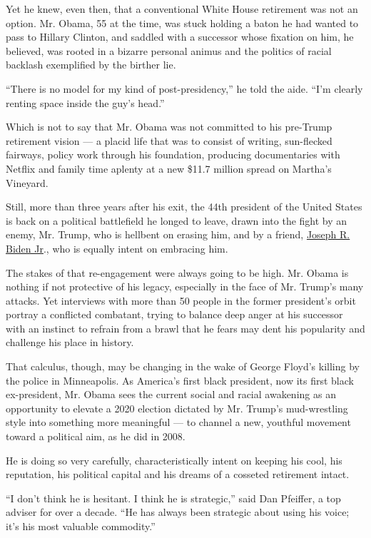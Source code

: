 Yet he knew, even then, that a conventional White House retirement was
not an option. Mr. Obama, 55 at the time, was stuck holding a baton he
had wanted to pass to Hillary Clinton, and saddled with a successor
whose fixation on him, he believed, was rooted in a bizarre personal
animus and the politics of racial backlash exemplified by the birther
lie.

``There is no model for my kind of post-presidency,'' he told the aide.
``I'm clearly renting space inside the guy's head.''

Which is not to say that Mr. Obama was not committed to his pre-Trump
retirement vision --- a placid life that was to consist of writing,
sun-flecked fairways, policy work through his foundation, producing
documentaries with Netflix and family time aplenty at a new \$11.7
million spread on Martha's Vineyard.

Still, more than three years after his exit, the 44th president of the
United States is back on a political battlefield he longed to leave,
drawn into the fight by an enemy, Mr. Trump, who is hellbent on erasing
him, and by a friend,
\href{https://www.nytimes.com/2020/07/23/arts/television/biden-obama-reunion-video.html}{Joseph
R. Biden Jr}., who is equally intent on embracing him.

The stakes of that re-engagement were always going to be high. Mr. Obama
is nothing if not protective of his legacy, especially in the face of
Mr. Trump's many attacks. Yet interviews with more than 50 people in the
former president's orbit portray a conflicted combatant, trying to
balance deep anger at his successor with an instinct to refrain from a
brawl that he fears may dent his popularity and challenge his place in
history.

That calculus, though, may be changing in the wake of George Floyd's
killing by the police in Minneapolis. As America's first black
president, now its first black ex-president, Mr. Obama sees the current
social and racial awakening as an opportunity to elevate a 2020 election
dictated by Mr. Trump's mud-wrestling style into something more
meaningful --- to channel a new, youthful movement toward a political
aim, as he did in 2008.

He is doing so very carefully, characteristically intent on keeping his
cool, his reputation, his political capital and his dreams of a cosseted
retirement intact.

``I don't think he is hesitant. I think he is strategic,'' said Dan
Pfeiffer, a top adviser for over a decade. ``He has always been
strategic about using his voice; it's his most valuable commodity.''

